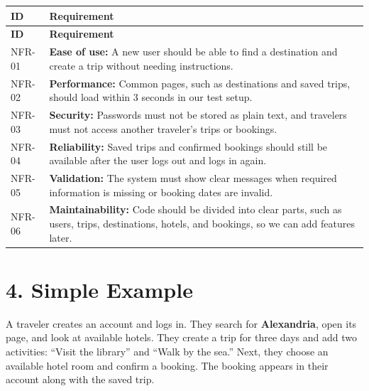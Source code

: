 \documentclass[11pt,a4paper]{article}
\begin{document}
\small
\begin{longtable}{|>{\raggedright\arraybackslash}p{1.12cm}|>{\raggedright\arraybackslash}p{12.63cm}|}
\hline
\rowcolor{lightblue}\textbf{ID} & \textbf{Requirement}\\\hline
\endfirsthead
\hline\rowcolor{lightblue}\textbf{ID} & \textbf{Requirement}\\\hline
\endhead
NFR-01 & \textbf{Ease of use:} A new user should be able to find a destination and create a trip without needing instructions.\\\hline
NFR-02 & \textbf{Performance:} Common pages, such as destinations and saved trips, should load within 3 seconds in our test setup.\\\hline
NFR-03 & \textbf{Security:} Passwords must not be stored as plain text, and travelers must not access another traveler's trips or bookings.\\\hline
NFR-04 & \textbf{Reliability:} Saved trips and confirmed bookings should still be available after the user logs out and logs in again.\\\hline
NFR-05 & \textbf{Validation:} The system must show clear messages when required information is missing or booking dates are invalid.\\\hline
NFR-06 & \textbf{Maintainability:} Code should be divided into clear parts, such as users, trips, destinations, hotels, and bookings, so we can add features later.\\\hline
\end{longtable}
\normalsize

\section{4. Simple Example}
A traveler creates an account and logs in. They search for \textbf{Alexandria}, open its page, and look at available hotels. They create a trip for three days and add two activities: ``Visit the library'' and ``Walk by the sea.'' Next, they choose an available hotel room and confirm a booking. The booking appears in their account along with the saved trip.
\end{document}
